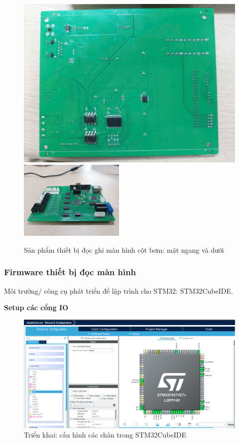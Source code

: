 \begin{figure}[!ht]
    \centering
    \includegraphics[width=0.45\linewidth]{Figures/Device_product-bottom-view.jpg}
    \hspace{0.02\textwidth}
    \includegraphics[width=0.45\textwidth]{Figures/Device_product-side-view.jpg}
    \caption{Sản phẩm thiết bị đọc ghi màn hình cột bơm: mặt ngang và dưới}
    \label{fig:device_product}
\end{figure}


\subsubsection{Firmware thiết bị đọc màn hình}

Môi trường/ công cụ phát triển để lập trình cho STM32: STM32CubeIDE.

\textbf{Setup các cổng IO}

\begin{figure}[!ht]
    \centering
    \includegraphics[width=1.0\linewidth]{Figures/Device_stm32-io-config.png}
    \caption{Triển khai: cấu hình các chân trong STM32CubeIDE}
    \label{fig:Device_stm32-io-config}
\end{figure}

